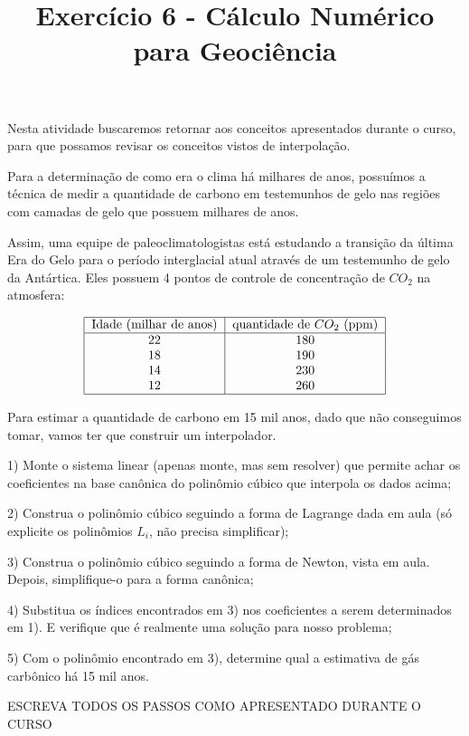 \documentclass{article}
\title{Exercício 6  -  Cálculo Numérico para Geociência}
\begin{document}
\maketitle




Nesta atividade buscaremos retornar aos conceitos apresentados durante o curso, para que possamos revisar os conceitos vistos de interpolação.

Para a determinação de como era o clima há milhares de anos, possuímos a técnica de medir a quantidade de carbono em testemunhos de gelo nas regiões com camadas de gelo que possuem milhares de anos. 

Assim, uma equipe de paleoclimatologistas está estudando a transição da última Era do Gelo para o período interglacial atual através de um testemunho de gelo da Antártica. Eles possuem 4 pontos de controle de concentração de $CO_2$ na atmosfera:

\begin{align*}
\begin{tabular}{|c|c|}
    \hline
    Idade (milhar de anos) & quantidade de $CO_2$ (ppm) \\
    \hline
     22 & 180\\
     18 & 190\\
     14 & 230\\
     12 & 260\\
     \hline
\end{tabular}
\end{align*}

Para estimar a quantidade de carbono em 15 mil anos, dado que não conseguimos tomar, vamos ter que construir um interpolador.

\vspace{0.2 cm}
\hline 
\vspace{0.2 cm}

1) Monte o sistema linear (apenas monte, mas sem resolver) que permite achar os coeficientes na base canônica do polinômio cúbico que interpola os dados acima; 

2) Construa o polinômio cúbico seguindo a forma de Lagrange dada em aula (só explicite os polinômios $L_i$, não precisa simplificar);

3) Construa o polinômio cúbico seguindo a forma de Newton, vista em aula. Depois, simplifique-o para a forma canônica;

4) Substitua os índices encontrados em 3) nos coeficientes a serem determinados em 1). E verifique que é realmente uma solução para nosso problema;

5) Com o polinômio encontrado em 3), determine qual a estimativa de gás carbônico há 15 mil anos.
















\vspace{2cm}
\noindent\centering\large{ESCREVA TODOS OS PASSOS COMO APRESENTADO DURANTE O CURSO}
\end{document}
